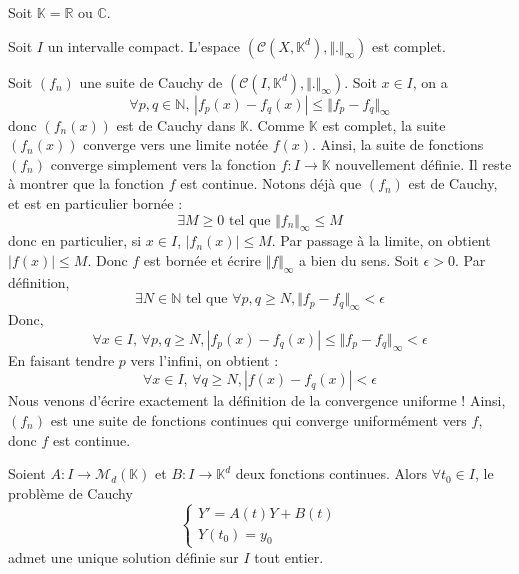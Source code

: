 




	Soit $\mathbb{K} = \mathbb{R}$ ou $\mathbb{C}$.

	\begin{lemma}
		Soit $I$ un intervalle compact. L'espace $(\mathcal{C} (X, \mathbb{K}^d), \Vert . \Vert_{\infty})$ est complet.
	\end{lemma}

	\begin{demonstration}
		Soit $(f_n)$ une suite de Cauchy de $(\mathcal{C} (I, \mathbb{K}^d), \Vert . \Vert_{\infty})$. Soit $x \in I$, on a
		\[ \forall p, q \in \mathbb{N}, \, |f_p(x) - f_q(x)| \leq \Vert f_p - f_q \Vert_\infty \]
		donc $(f_n(x))$ est de Cauchy dans $\mathbb{K}$. Comme $\mathbb{K}$ est complet, la suite $(f_n(x))$ converge vers une limite notée $f(x)$. Ainsi, la suite de fonctions $(f_n)$ converge simplement vers la fonction $f : I \rightarrow \mathbb{K}$ nouvellement définie. Il reste à montrer que la fonction $f$ est continue.
		\newpar
		Notons déjà que $(f_n)$ est de Cauchy, et est en particulier bornée :
		\[ \exists M \geq 0 \text{ tel que } \Vert f_n \Vert_\infty \leq M \]
		donc en particulier, si $x \in I$, $|f_n(x)| \leq M$. Par passage à la limite, on obtient $|f(x)| \leq M$. Donc $f$ est bornée et écrire $\Vert f \Vert_{\infty}$ a bien du sens.
		\newpar
		Soit $\epsilon > 0$. Par définition,
		\[ \exists N \in \mathbb{N} \text{ tel que } \forall p, q \geq N, \Vert f_p - f_q \Vert_\infty < \epsilon \]
		Donc,
		\[ \forall x \in I, \, \forall p, q \geq N, |f_p(x) - f_q(x)| \leq \Vert f_p - f_q \Vert_\infty < \epsilon \]
		En faisant tendre $p$ vers l'infini, on obtient :
		\[ \forall x \in I, \, \forall q \geq N, |f(x) - f_q(x)| < \epsilon \]
		Nous venons d'écrire exactement la définition de la convergence uniforme ! Ainsi, $(f_n)$ est une suite de fonctions continues qui converge uniformément vers $f$, donc $f$ est continue.
	\end{demonstration}


	\begin{theorem}
		Soient $A : I \rightarrow \mathcal{M}_d(\mathbb{K})$ et $B : I \rightarrow \mathbb{K}^d$ deux fonctions continues. Alors $\forall t_0 \in I$, le problème de Cauchy
		\[ \begin{cases} Y' = A(t)Y + B(t) \\ Y(t_0) = y_0 \end{cases} \tag{$C$} \]
		admet une unique solution définie sur $I$ tout entier.
	\end{theorem}

